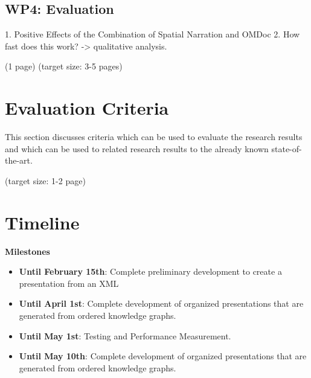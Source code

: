\documentclass[twoside]{article}
\begin{document}
\subsection{WP4: Evaluation}
1. Positive Effects of the Combination of Spatial Narration and OMDoc
2. How fast does this work?
-> qualitative analysis. 

(1 page)
\newpage
  (target size: 3-5 pages)
\newpage


\section{Evaluation Criteria}



  This section discusses criteria which can be used to evaluate the
  research results and which can be used to related research results
  to the already known state-of-the-art.

  (target size: 1-2 page)
\newpage
  \section{Timeline}

\textbf{Milestones}
\begin{itemize}
\item \textbf{Until February 15th}: Complete preliminary development to create a presentation from an XML
\item \textbf{Until April 1st}: Complete development of organized presentations that are generated from ordered knowledge graphs.
\item \textbf{Until May 1st}: Testing and Performance Measurement.
\item \textbf{Until May 10th}: Complete development of organized presentations that are generated from ordered knowledge graphs.
\end{itemize}

\end{document}
